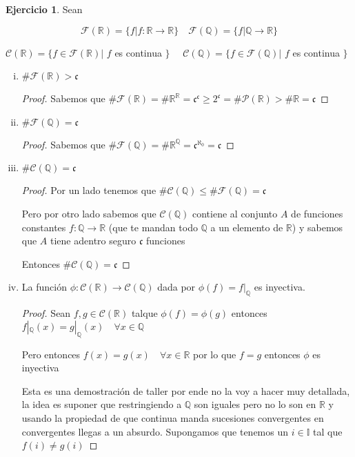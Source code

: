 \documentclass[12pt]{article}
\newcommand{\n}{\aleph_{0}}
\newcommand{\Q}{\mathbb{Q}}
\newcommand{\R}{\mathbb{R}}
\newcommand{\I}{\mathbb{I}}
\newcommand{\ra}{\rightarrow}
\theoremstyle{definition}
\newtheorem{ej}{Ejercicio}
\begin{document}
\noindent 
\begin{ej} Sean 

$$ \mathcal{F}(\R) = \{f | f:\R \ra \R \} \quad \mathcal{F}(\Q) = \{f | \Q \ra \R \}$$

\begin{center} $ \mathcal{C}(\R) = \{f \in \mathcal{F}(\R) | $ $f $ es continua $\} \quad$ $\mathcal{C}(\Q) = \{f \in \mathcal{F}(\Q) |$ $ f $ es continua $\} $ \end{center}
  \begin{enumerate}[i.]
    \item $\#\mathcal{F}(\R) > \mathfrak{c}$
      \begin{proof}
	Sabemos que $\# \mathcal{F}(\R) = \# \R^{\R} =  \mathfrak{c}^{\mathfrak{c}} \geq 2^{\mathfrak{c}} = \# \mathcal{P}(\R) > \# \R =  \mathfrak{c}$
      \end{proof}
    \item $\# \mathcal{F}(\Q) = \mathfrak{c}$
      \begin{proof}
	Sabemos que $\# \mathcal{F}(\Q) = \# \R^{\Q} = \mathfrak{c}^{\n} = \mathfrak{c}$	

	      \end{proof}
    \item $\# \mathcal{C}(\Q) = \mathfrak{c}$
      \begin{proof}
	Por un lado tenemos que $\# \mathcal{C}(\Q)  \leq \# \mathcal{F}(\Q) = \mathfrak{c}$ 

	Pero por otro lado sabemos que $\mathcal{C}(\Q)$ contiene al conjunto $A$ de funciones constantes $f: \Q \ra \R$ (que te mandan todo $\Q$ a un elemento de $\R$) y sabemos que $A$ tiene adentro seguro $\mathfrak{c}$ funciones

	Entonces $\# \mathcal{C}(\Q) = \mathfrak{c}$
      \end{proof}
    \item La función $\phi : \mathcal{C}(\R) \ra \mathcal{C}(\Q)$ dada por $\phi(f) = f|_{\Q}$ es inyectiva.
      \begin{proof}
      Sean $f,g \in \mathcal{C}(\R) $ talque $\phi (f) = \phi(g)$ entonces $f|_{\Q}(x) = g|_{\Q}(x) \quad \forall x \in \Q$

      Pero entonces $f(x) = g(x) \quad \forall x \in \R$ por lo que $f = g $ entonces $\phi$ es inyectiva

      Esta es una demostración de taller por ende no la voy a hacer muy detallada, la idea es suponer que restringiendo a $\Q$ son iguales pero no lo son en $\R$ y usando la propiedad de que continua manda sucesiones convergentes en convergentes llegas a un absurdo. Supongamos que tenemos un $i \in \I$ tal que $f(i) \neq g(i)$


\end{proof}
\end{enumerate}
\end{ej}
\end{document}
